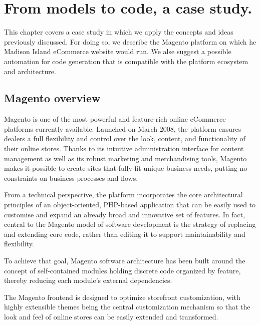 \chead{}

\chapter{From models to code, a case study.}

This chapter covers a case study in which we apply the concepts and ideas previously discussed. For doing so, we describe the Magento platform on which he Madison Island eCommerce website would run. We alse suggest a possible automation for code generation that is compatible with the platform ecosystem and architecture.

\section{Magento overview}

Magento is one of the most powerful and feature-rich online eCommerce platforms currently available. Launched on March 2008, the platform ensures dealers a full flexibility and control over the look, content, and functionality of their online stores. Thanks to its intuitive administration interface for content management as well as its robust marketing and merchandising tools, Magento makes it possible to create sites that fully fit unique business needs, putting no constraints on business processes and flows.

From a technical perspective, the platform incorporates the core architectural principles of an object-oriented, PHP-based application that can be easily used to customise and expand an already broad and innovative set of features. In fact, central to the Magento model of software development is the strategy of replacing and extending core code, rather than editing it to support maintainability and flexibility. 

To achieve that goal, Magento software architecture has been built around the concept of self-contained modules holding discrete code organized by feature, thereby reducing each module’s external dependencies.

The Magento frontend is designed to optimize storefront customization, with highly extensible themes being the central customization mechanism so that the look and feel of online stores can be easily extended and transformed.

